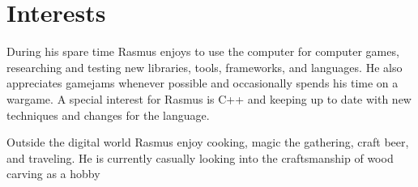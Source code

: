 \documentclass[a4paper,10pt]{article}
\begin{document}
\section{Interests}
During his spare time Rasmus enjoys to use the computer for computer games,
researching and testing new libraries, tools, frameworks, and languages. He also
appreciates gamejams whenever possible and occasionally spends his time on a wargame.
A special interest for Rasmus is C++ and keeping up to date with new techniques and
changes for the language.

Outside the digital world Rasmus enjoy cooking, magic the gathering, craft beer, and
traveling. He is currently casually looking into the craftsmanship of wood carving as a
hobby
\end{document}
